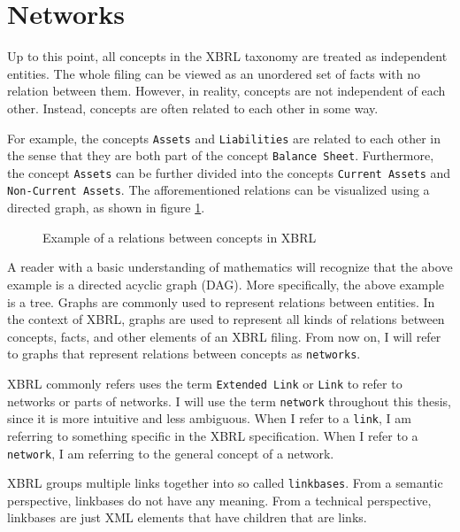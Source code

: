 \section{Networks}
\label{sec:xbrl_networks}

Up to this point, all concepts in the XBRL taxonomy are treated as independent entities.
The whole filing can be viewed as an unordered set of facts with no relation between them.
However, in reality, concepts are not independent of each other.
Instead, concepts are often related to each other in some way.

For example, the concepts \texttt{Assets} and \texttt{Liabilities} are related to each other in the sense that they are both part of the concept \texttt{Balance Sheet}.
Furthermore, the concept \texttt{Assets} can be further divided into the concepts \texttt{Current Assets} and \texttt{Non-Current Assets}.
The afforementioned relations can be visualized using a directed graph, as shown in figure \ref{fig:example_visualization_network_xbrl}.

\begin{figure}[H]
    \caption{Example of a relations between concepts in XBRL}
    \label{fig:example_visualization_network_xbrl}
\end{figure}

A reader with a basic understanding of mathematics will recognize that the above example is a directed acyclic graph (DAG).
More specifically, the above example is a tree.
Graphs are commonly used to represent relations between entities.
In the context of XBRL, graphs are used to represent all kinds of relations between concepts, facts, and other elements of an XBRL filing.
From now on, I will refer to graphs that represent relations between concepts as \texttt{networks}.

XBRL commonly refers uses the term \texttt{Extended Link} or \texttt{Link} to refer to networks or parts of networks.
I will use the term \texttt{network} throughout this thesis, since it is more intuitive and less ambiguous.
When I refer to a \texttt{link}, I am referring to something specific in the XBRL specification.
When I refer to a \texttt{network}, I am referring to the general concept of a network.

XBRL groups multiple links together into so called \texttt{linkbases}.
From a semantic perspective, linkbases do not have any meaning.
From a technical perspective, linkbases are just XML elements that have children that are links. 

